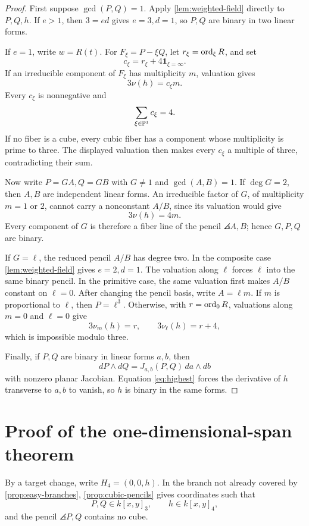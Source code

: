 \documentclass[11pt,reqno]{amsart}
\begin{document}
\begin{proof}
First suppose \(\gcd(P,Q)=1\).  Apply
\cref{lem:weighted-field} directly to \(P,Q,h\).
If \(e>1\), then \(3=ed\) gives \(e=3,d=1\), so \(P,Q\) are binary in two
linear forms.

If \(e=1\), write \(w=R(t)\).  For
\(F_\xi=P-\xi Q\), let \(r_\xi=\operatorname{ord}_\xi R\), and set
\[
c_\xi=r_\xi+4\mathbf1_{\xi=\infty}.
\]
If an irreducible component of \(F_\xi\) has multiplicity \(m\), valuation
gives
\[
3\nu(h)=c_\xi m.
\]
Every \(c_\xi\) is nonnegative and
\[
\sum_{\xi\in\mathbb P^1}c_\xi=4.
\]
If no fiber is a cube, every cubic fiber has a component whose multiplicity
is prime to three.  The displayed valuation then makes every \(c_\xi\) a
multiple of three, contradicting their sum.

Now write \(P=GA,Q=GB\) with \(G\ne1\) and \(\gcd(A,B)=1\).
If \(\deg G=2\), then \(A,B\) are independent linear forms.  An irreducible
factor of \(G\), of multiplicity \(m=1\) or \(2\), cannot carry a
nonconstant \(A/B\), since its valuation would give
\[
3\nu(h)=4m.
\]
Every component of \(G\) is therefore a fiber line of the pencil
\(\angles{A,B}\); hence \(G,P,Q\) are binary.

If \(G=\ell\), the reduced pencil \(A/B\) has degree two.  In the composite
case \cref{lem:weighted-field} gives \(e=2,d=1\).  The valuation along
\(\ell\) forces \(\ell\) into the same binary pencil.  In the primitive
case, the same valuation first makes \(A/B\) constant on \(\ell=0\).
After changing the pencil basis, write \(A=\ell m\).  If
\(m\) is proportional to \(\ell\), then \(P=\ell^3\).  Otherwise, with
\(r=\operatorname{ord}_0R\), valuations along \(m=0\) and \(\ell=0\) give
\[
3\nu_m(h)=r,\qquad 3\nu_\ell(h)=r+4,
\]
which is impossible modulo three.

Finally, if \(P,Q\) are binary in linear forms \(a,b\), then
\[
dP\wedge dQ=J_{a,b}(P,Q)\,da\wedge db
\]
with nonzero planar Jacobian.  Equation \eqref{eq:highest} forces the
derivative of \(h\) transverse to \(a,b\) to vanish, so \(h\) is binary in
the same forms.
\end{proof}

\section{Proof of the one-dimensional-span theorem}
\label{sec:rank-one-proof}

By a target change, write \(H_4=(0,0,h)\).  In the branch not already covered
by \cref{prop:easy-branches}, \cref{prop:cubic-pencils} gives coordinates
such that
\[
P,Q\in k[x,y]_3,\qquad h\in k[x,y]_4,
\]
and the pencil \(\angles{P,Q}\) contains no cube.
\end{document}
